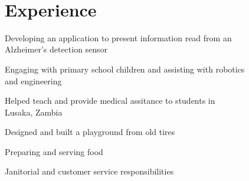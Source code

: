 \documentclass{resume}
\begin{document}
\vspace{3mm}
\hspace{0mm}\\
\vspace{0.5 mm}


\section{Experience}

\vspace{1.2mm}
\hfill{}
\begin{tightemize} \item Developing an application to present information read from an \\Alzheimer's detection sensor
\end{tightemize}

\hfill{}
\begin{tightemize} \item Engaging with primary school children and assisting with robotics\\and engineering
\end{tightemize}

\vspace{1.2mm}
\hfill{}
\begin{tightemize} \item Helped teach and provide medical assitance to students in \\Lusaka, Zambia \item Designed and built a playground from old tires
\end{tightemize}

\vspace{1.2mm}
\hfill{}
\begin{tightemize} \item Preparing and serving food \item Janitorial and customer service responsibilities
\end{tightemize}
\end{document}

